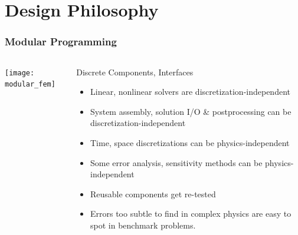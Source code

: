 \documentclass[mathserif]{beamer}
\begin{document}
\section{Design Philosophy}

\begin{frame}
\frametitle{Modular Programming}
\begin{columns}
\begin{column}{.35\textwidth}
\begin{center}
\texttt{[image: modular\_fem]}
\end{center}
\end{column}
\begin{column}{.65\textwidth}
\begin{block}{Discrete Components, Interfaces}
\begin{itemize}
\item Linear, nonlinear solvers are discretization-independent
\item System assembly, solution I/O \& postprocessing can be
discretization-independent
\item Time, space discretizations can be physics-independent
\item Some error analysis, sensitivity methods can be
physics-independent
\end{itemize}
\end{block}

\begin{itemize}
\item Reusable components get re-tested

\item Errors too subtle to find in complex physics are easy to spot
in benchmark problems.
\end{itemize}
\end{column}
\end{columns}

\end{frame}
\end{document}

